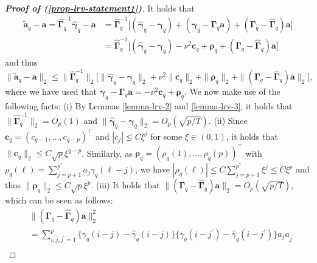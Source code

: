 \begin{proof}[\textnormal{\textbf{Proof of (\ref{prop-lrv-statement1})}}] It holds that   
\begin{align*}
\widetilde{\boldsymbol{a}}_q - \boldsymbol{a} = \widehat{\boldsymbol{\Gamma}}_q^{-1} \widehat{\boldsymbol{\gamma}}_q - \boldsymbol{a}   
 & = \widehat{\boldsymbol{\Gamma}}_q^{-1} \big[ (\widehat{\boldsymbol{\gamma}}_q - \boldsymbol{\gamma}_q) + (\boldsymbol{\gamma}_q - \boldsymbol{\Gamma}_q \boldsymbol{a}) + (\boldsymbol{\Gamma}_q - \widehat{\boldsymbol{\Gamma}}_q)\boldsymbol{a} \big] \\
 & = \widehat{\boldsymbol{\Gamma}}_q^{-1} \big[ (\widehat{\boldsymbol{\gamma}}_q - \boldsymbol{\gamma}_q) - \nu^2 \boldsymbol{c}_q + \boldsymbol{\rho}_q  + (\boldsymbol{\Gamma}_q - \widehat{\boldsymbol{\Gamma}}_q)\boldsymbol{a} \big] 
\end{align*}
and thus 
\begin{equation}\label{eq1-prop-lrv-statement1}
\| \widetilde{\boldsymbol{a}}_q - \boldsymbol{a} \|_2 \le \| \widehat{\boldsymbol{\Gamma}}_q^{-1} \|_2 \Big[ \| \widehat{\boldsymbol{\gamma}}_q - \boldsymbol{\gamma}_q \|_2 + \nu^2 \| \boldsymbol{c}_q \|_2 + \| \boldsymbol{\rho}_q \|_2 + \| (\boldsymbol{\Gamma}_q - \widehat{\boldsymbol{\Gamma}}_q) \boldsymbol{a} \|_2 \Big], 
\end{equation}
where we have used that $\boldsymbol{\gamma}_q - \boldsymbol{\Gamma}_q \boldsymbol{a} = -\nu^2 \boldsymbol{c}_q + \boldsymbol{\rho}_q$. We now make use of the following facts: (i) By Lemmas \ref{lemma-lrv-2} and \ref{lemma-lrv-3}, it holds that $\| \widehat{\boldsymbol{\Gamma}}_q^{-1} \|_2 = O_p(1)$ and $\| \widehat{\boldsymbol{\gamma}}_q - \boldsymbol{\gamma}_q \|_2 = O_p(\sqrt{p/T})$. (ii) Since $\boldsymbol{c}_q = (c_{q-1},\ldots,c_{q-p})^\top$ and $|c_j| \le C \xi^j$ for some $\xi \in (0,1)$, it holds that $\| \boldsymbol{c}_q \|_2 \le C \sqrt{p} \xi^{q-p}$. Similarly, as $\boldsymbol{\rho}_q = (\rho_q(1),\ldots,\rho_q(p))^\top$ with $\rho_q(\ell) = \sum_{j=p+1}^{p^*} a_j \gamma_q(\ell-j)$, we have $|\rho_q(\ell)| \le C \sum_{j=p+1}^{p^*} \xi^j \le C \xi^p$ and thus $\| \boldsymbol{\rho}_q \|_2 \le C \sqrt{p} \xi^p$. (iii) It holds that $\| (\boldsymbol{\Gamma}_q - \widehat{\boldsymbol{\Gamma}}_q) \boldsymbol{a} \|_2 = O_p(\sqrt{p/T})$, which can be seen as follows: 
\begin{align*}
 & \| (\boldsymbol{\Gamma}_q - \widehat{\boldsymbol{\Gamma}}_q) \boldsymbol{a} \|_2^2 \\
 & = \sum_{i,j,j^\prime=1}^p \big\{ \gamma_q(i-j) - \widehat{\gamma}_q(i-j) \big \} \big\{ \gamma_q(i-j^\prime) - \widehat{\gamma}_q(i-j^\prime) \big \} a_j a_{j^\prime} \\ 

\end{align*}
\end{proof}

